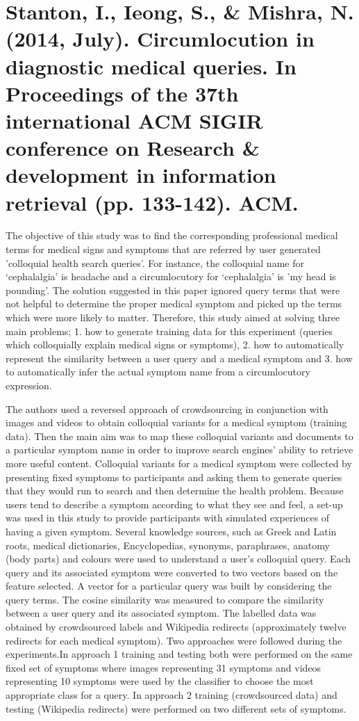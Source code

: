 \documentclass[]{article}
\begin{document}
\section{Stanton, I., Ieong, S., \& Mishra, N. (2014, July). Circumlocution in diagnostic medical queries. In Proceedings of the 37th international ACM SIGIR conference on Research \& development in information retrieval (pp. 133-142). ACM.}

The objective of this study was to find the corresponding professional medical terms for medical signs and symptoms that are referred by user generated 'colloquial health search queries'. For instance, the colloquial name for ‘cephalalgia’ is headache and a circumlocutory for ‘cephalalgia’ is 'my head is pounding'. The solution suggested in this paper ignored query terms that were not helpful to determine the proper medical symptom and picked up the terms which were more likely to matter. Therefore, this study aimed at solving three main problems; 1. how to generate training data for this experiment (queries which colloquially explain medical signs or symptoms), 2. how to automatically represent the similarity between a user query and a medical symptom and 3. how to automatically infer the actual symptom name from a circumlocutory expression. 

The authors used a reversed approach of crowdsourcing in conjunction with images and videos to obtain colloquial variants for a medical symptom (training data). Then the main aim was to map these colloquial variants and documents to a particular symptom name in order to improve search engines' ability to retrieve more useful content. Colloquial variants for a medical symptom were collected by presenting fixed symptoms to participants and asking them to generate queries that they would run to search and then determine the health problem. Because users tend to describe a symptom according to what they see and feel, a set-up was used in this study to provide participants with simulated experiences of having a given symptom. Several knowledge sources, such as Greek and Latin roots, medical dictionaries, Encyclopedias, synonyms, paraphrases, anatomy (body parts) and colours were used to understand a user's colloquial query. Each query and its associated symptom were converted to two vectors based on the feature selected. A vector for a particular query was built by considering the query terms. The cosine similarity was measured to compare the similarity between a user query and its associated symptom. The labelled data was obtained by crowdsourced labels and Wikipedia redirects (approximately twelve redirects for each medical symptom).  Two approaches were followed during the experiments.In approach 1 training and testing both were performed on the same fixed set of symptoms where images representing 31 symptoms and videos representing 10 symptoms were used by the classifier to choose the most appropriate class for a query. In approach 2 training (crowdsourced data) and testing (Wikipedia redirects) were performed on two different sets of symptoms.     
\end{document}
